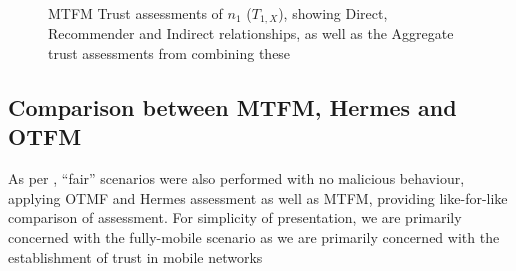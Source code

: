 \documentclass[conference]{IEEEtran}
\begin{document}
\begin{figure}[h]
  \caption{MTFM Trust assessments of $n_1$ ($T_{1,X}$), showing Direct, Recommender and Indirect relationships, as well as the Aggregate trust assessments from combining these\protect\footnotemark} 
  \label{fig:trust_mobility}
\end{figure}
%

\subsection{Comparison between MTFM, Hermes and OTFM}
As per \cite{Guo11}, ``fair'' scenarios were also performed with no malicious behaviour, applying OTMF and Hermes assessment as well as MTFM, providing like-for-like comparison of assessment.
For simplicity of presentation, we are primarily concerned with the fully-mobile scenario as we are primarily concerned with the establishment of trust in mobile networks
\end{document}

